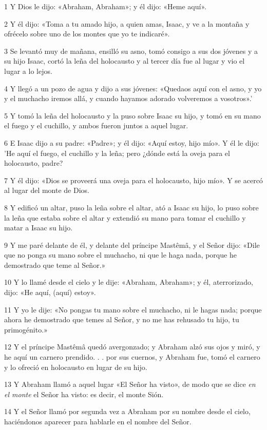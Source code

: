 \par 1 Y Dios le dijo: «Abraham, Abraham»; y él dijo: «Heme aquí».
\par 2 Y él dijo: «Toma a tu amado hijo, a quien amas, Isaac, y ve a la montaña y ofrécelo sobre uno de los montes que yo te indicaré».
\par 3 Se levantó muy de mañana, ensilló su asno, tomó consigo a sus dos jóvenes y a su hijo Isaac, cortó la leña del holocausto y al tercer día fue al lugar y vio el lugar a lo lejos.
\par 4 Y llegó a un pozo de agua y dijo a sus jóvenes: «Quedaos aquí con el asno, y yo y el muchacho iremos allá, y cuando hayamos adorado volveremos a vosotros».'
\par 5 Y tomó la leña del holocausto y la puso sobre Isaac su hijo, y tomó en su mano el fuego y el cuchillo, y ambos fueron juntos a aquel lugar.
\par 6 E Isaac dijo a su padre: «Padre»; y él dijo: «Aquí estoy, hijo mío». Y él le dijo: 'He aquí el fuego, el cuchillo y la leña; pero ¿dónde está la oveja para el holocausto, padre?
\par 7 Y él dijo: «Dios se proveerá una oveja para el holocausto, hijo mío». Y se acercó al lugar del monte de Dios.
\par 8 Y edificó un altar, puso la leña sobre el altar, ató a Isaac su hijo, lo puso sobre la leña que estaba sobre el altar y extendió su mano para tomar el cuchillo y matar a Isaac su hijo.
\par 9 Y me paré delante de él, y delante del príncipe Mastêmâ, y el Señor dijo: «Dile que no ponga su mano sobre el muchacho, ni que le haga nada, porque he demostrado que teme al Señor.»
\par 10 Y lo llamé desde el cielo y le dije: «Abraham, Abraham»; y él, aterrorizado, dijo: «He aquí, (aquí) estoy».
\par 11 Y yo le dije: «No pongas tu mano sobre el muchacho, ni le hagas nada; porque ahora he demostrado que temes al Señor, y no me has rehusado tu hijo, tu primogénito.»
\par 12 Y el príncipe Mastêmâ quedó avergonzado; y Abraham alzó sus ojos y miró, y he aquí un carnero prendido. . . por sus cuernos, y Abraham fue, tomó el carnero y lo ofreció en holocausto en lugar de su hijo.
\par 13 Y Abraham llamó a aquel lugar «El Señor ha visto», de modo que se dice \textit{en el monte} el Señor ha visto: es decir, el monte Sión.
\par 14 Y el Señor llamó por segunda vez a Abraham por su nombre desde el cielo, haciéndonos aparecer para hablarle en el nombre del Señor.
